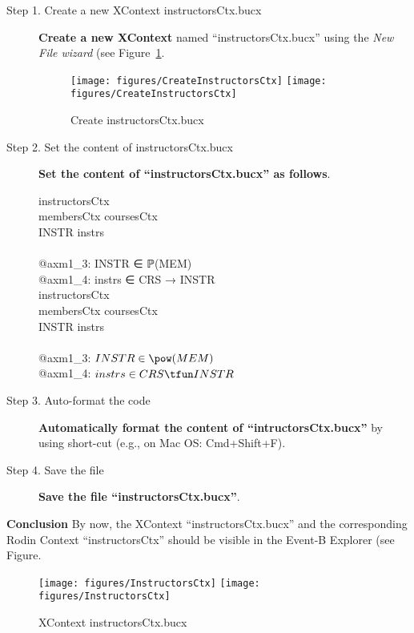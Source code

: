 \begin{description}
\item[Step 1. Create a new XContext instructorsCtx.bucx] \textbf{Create a new XContext} named ``instructorsCtx.bucx'' using the \emph{New File wizard} (see Figure~\ref{fig:CreateInstructorsCtx}.
  \begin{figure}[!htbp]
    \centering
    \texttt{[image: figures/CreateInstructorsCtx]}
    \else
    \texttt{[image: figures/CreateInstructorsCtx]}
    \endif
    \caption{Create instructorsCtx.bucx}
    \label{fig:CreateInstructorsCtx}
  \end{figure}

\item[Step 2. Set the content of instructorsCtx.bucx] \textbf{Set the content of ``instructorsCtx.bucx'' as follows}.
  \begin{center}
    \begin{Bcode}
      \Bcontext{} instructorsCtx\\
      \Bextends{} membersCtx coursesCtx\\
      \Bconstants{} INSTR instrs\\
      \Baxioms\\
      @axm1_3: INSTR ∈ ℙ(MEM)\\
      @axm1_4: instrs ∈ CRS → INSTR\\
      \Bend
      \else
      \Bcontext{} instructorsCtx\\
      \Bextends{} membersCtx coursesCtx\\
      \Bconstants{} INSTR instrs\\
      \Baxioms\\
      \Btab @axm1_3: \(INSTR \in \pow(MEM)\)\\
      \Btab @axm1_4: \(instrs \in CRS \tfun INSTR\)\\
      \Bend
      \endif
    \end{Bcode}
  \end{center}

\item[Step 3. Auto-format the code] \textbf{Automatically format the content of ``intructorsCtx.bucx''} by using short-cut (e.g., on Mac OS: Cmd+Shift+F).

\item[Step 4. Save the file] \textbf{Save the file ``instructorsCtx.bucx''}.
\end{description}

\textbf{Conclusion} By now, the XContext ``instructorsCtx.bucx'' and the corresponding Rodin Context ``instructorsCtx'' should be visible in the Event-B Explorer (see Figure.
  \begin{figure}[!htbp]
    \centering
    \texttt{[image: figures/InstructorsCtx]}
    \else
    \texttt{[image: figures/InstructorsCtx]}
    \endif
    \caption{XContext instructorsCtx.bucx}
    \label{fig:instructorsCtx}
  \end{figure}


